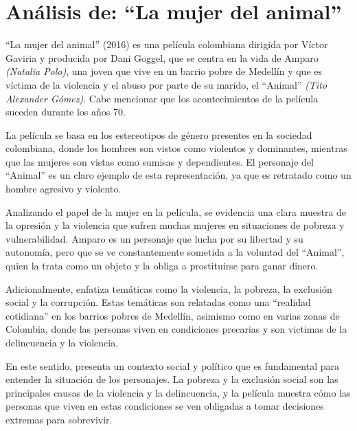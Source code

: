 \documentclass[letterpaper, 12pt]{report}
\begin{document}
\chapter*{Análisis de: ``La mujer del animal''}

\nocite{Pelicula}

``La mujer del animal'' (2016) es una película colombiana dirigida por Víctor Gaviria y
producida por Dani Goggel, que se centra en la vida de Amparo
\textit{(Natalia Polo)}, una joven que vive en un barrio pobre de Medellín
y que es víctima de la violencia y el abuso por parte de su marido, el
``Animal'' \textit{(Tito Alexander Gómez)}. Cabe mencionar que los
acontecimientos de la película suceden durante los años 70.

La película se basa en los estereotipos de género presentes
en la sociedad colombiana, donde los hombres son vistos
como violentos y dominantes, mientras que las mujeres son
vistas como sumisas y dependientes. El personaje del
``Animal'' es un claro ejemplo de esta representación, ya
que es retratado como un hombre agresivo y violento.

Analizando el papel de la mujer en la película, se
evidencia una clara muestra de la opresión y la violencia
que sufren muchas mujeres en situaciones de pobreza y
vulnerabilidad. Amparo es un personaje que lucha por su
libertad y su autonomía, pero que se ve constantemente
sometida a la voluntad del ``Animal'', quien la trata como
un objeto y la obliga a prostituirse para ganar dinero.


Adicionalmente, enfatiza temáticas como la violencia, la
pobreza, la exclusión social y la corrupción. Estas temáticas son
relatadas como una ``realidad cotidiana'' en los barrios pobres de Medellín,
asimismo como en varias zonas de Colombia, donde las personas viven en 
condiciones precarias y son victimas de la delincuencia y la violencia.

En este sentido, presenta un contexto social y político que
es fundamental para entender la situación de los
personajes. La pobreza y la exclusión social son las
principales causas de la violencia y la delincuencia, y la
película muestra cómo las personas que viven en estas
condiciones se ven obligadas a tomar decisiones extremas
para sobrevivir.
\end{document}
